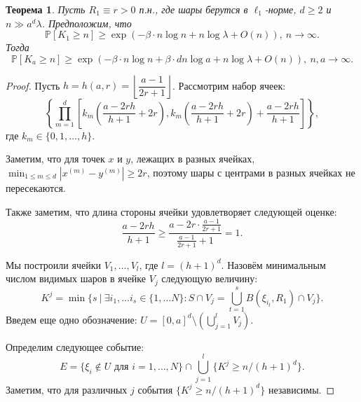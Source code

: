 \documentclass[12pt]{article}
\theoremstyle{plain}
\newtheorem{thm}{Теорема} %
\theoremstyle{definition}
\theoremstyle{remark}
\def\geq{\geqslant}
\def\leq{\leqslant}
\newcommand{\PP}{\mathbb{P}}
\begin{document}
\begin{thm}
Пусть $R_1\equiv r > 0$ п.н., где шары берутся в $\ell_1$-норме, $d\geq 2$ и $n \gg a^d\lambda$. 
Предположим, что 
\begin{equation*}
    \PP[K_1 \geq n] \geq \exp \left(-\beta\cdot n\log n + n\log\lambda + O(n)\right),\  n \to \infty.
\end{equation*}{}
Тогда 
\begin{equation*}
    \PP[K_a \geq n] \geq \exp \left(-\beta\cdot n\log n + \beta\cdot dn\log a + n\log\lambda + O(n)\right),\  n, a \to \infty.
\end{equation*}{}
\end{thm}

\begin{proof}
Пусть $h = h(a, r) = \left\lfloor\dfrac{a-1}{2r+1}\right\rfloor$. Рассмотрим набор ячеек:
\begin{equation*}
    \left\{\prod_{m = 1}^d\left[k_m\left(\dfrac{a - 2rh}{h+1} + 2r\right), k_m\left(\dfrac{a - 2rh}{h+1} + 2r\right) + \dfrac{a - 2rh}{h+1}\right]\right\},
\end{equation*}{}
где $k_m\in \{0, 1, \ldots, h\}$.

Заметим, что для точек $x$ и $y$, лежащих в разных ячейках, $\min_{1\leq m\leq d} |x^{(m)} - y^{(m)}| \geq 2r$, поэтому шары с центрами в разных ячейках не пересекаются. 

Также заметим, что длина стороны ячейки удовлетворяет следующей оценке:
\begin{equation*}
    \dfrac{a - 2rh}{h+1} \geq \dfrac{a - 2r\cdot \frac{a-1}{2r+1}}{\frac{a-1}{2r+1} + 1} = 1.
\end{equation*}{}

Мы построили ячейки $V_1, \ldots, V_l$, где $l = (h+1)^d$. Назовём минимальным числом видимых шаров в ячейке $V_j$ следующую величину:
\begin{equation*}
    K^j = \min\{s\ |\ \exists i_1, \ldots i_s \in \{1, \ldots N\} \colon S \cap V_j = \bigcup_{t = 1}^s B(\xi_{i_t}, R_1)\cap V_j \}.
\end{equation*}{}
Введем еще одно обозначение: $U = [0,a]^d \setminus (\bigcup_{j=1}^l V_j)$.

Определим следующее событие:
\begin{equation*}
    E = \{\xi_i \not\in U \text{ для } i = 1, \ldots, N\} \cap \bigcup_{j = 1}^l\{K^j \geq n/(h+1)^d\}.
\end{equation*}{}
Заметим, что для различных $j$ события $\{K^j \geq n/(h+1)^d\}$ независимы.


\end{proof}
\end{document}
